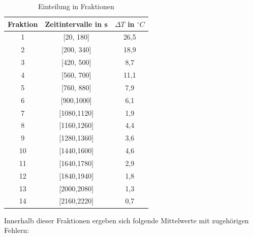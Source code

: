 \begin{table}
\centering
\begin{tabular}{ccc}

Fraktion&	Zeitintervalle in s	& $\Delta T $ in $ ^{\circ} C$ \\
\toprule
1		&[20, 180]		&26,5\\

2		&[200, 340]		&18,9\\

3		&[420, 500]		&8,7\\

4		&[560, 700]		&11,1\\

5		&[760, 880]		&7,9\\

6		&[900,1000]		&6,1\\

7		&[1080,1120]		&1,9\\

8		&[1160,1260]		&4,4\\

9		&[1280,1360]		&3,6\\

10		&[1440,1600]		&4,6\\

11		&[1640,1780]		&2,9\\

12		&[1840,1940]		&1,8\\

13		&[2000,2080]		&1,3\\

14		&[2160,2220]		&0,7\\

\end{tabular}

\caption{Einteilung in Fraktionen}
\label{tbl_2}
\end{table}



Innerhalb dieser Fraktionen ergeben sich folgende Mittelwerte mit zugehörigen Fehlern:

